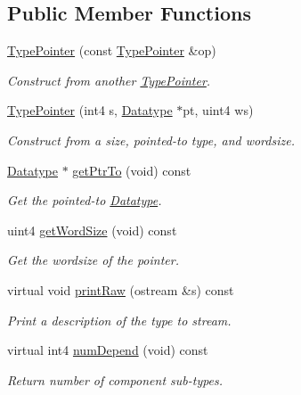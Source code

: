 \subsection*{Public Member Functions}
\begin{DoxyCompactItemize}
\item 
\mbox{\hyperlink{class_type_pointer_a900b24dbd7c0f62e6588312e9c7e3bc6}{Type\+Pointer}} (const \mbox{\hyperlink{class_type_pointer}{Type\+Pointer}} \&op)
\begin{DoxyCompactList}\small\item\em Construct from another \mbox{\hyperlink{class_type_pointer}{Type\+Pointer}}. \end{DoxyCompactList}\item 
\mbox{\hyperlink{class_type_pointer_a22ed9237fd9579b823cf43daefba0c98}{Type\+Pointer}} (int4 s, \mbox{\hyperlink{class_datatype}{Datatype}} $\ast$pt, uint4 ws)
\begin{DoxyCompactList}\small\item\em Construct from a size, pointed-\/to type, and wordsize. \end{DoxyCompactList}\item 
\mbox{\hyperlink{class_datatype}{Datatype}} $\ast$ \mbox{\hyperlink{class_type_pointer_a670e83f887a645c91633a7fa54c60420}{get\+Ptr\+To}} (void) const
\begin{DoxyCompactList}\small\item\em Get the pointed-\/to \mbox{\hyperlink{class_datatype}{Datatype}}. \end{DoxyCompactList}\item 
uint4 \mbox{\hyperlink{class_type_pointer_a6991671504f1098ccba2bcc40adcd3e9}{get\+Word\+Size}} (void) const
\begin{DoxyCompactList}\small\item\em Get the wordsize of the pointer. \end{DoxyCompactList}\item 
virtual void \mbox{\hyperlink{class_type_pointer_a0aece76a1fd245a58d75136ca81fca1b}{print\+Raw}} (ostream \&s) const
\begin{DoxyCompactList}\small\item\em Print a description of the type to stream. \end{DoxyCompactList}\item 
virtual int4 \mbox{\hyperlink{class_type_pointer_a376a0feb3fb85e98df0a7a9f1eeee0ce}{num\+Depend}} (void) const
\begin{DoxyCompactList}\small\item\em Return number of component sub-\/types. \end{DoxyCompactList}\item 

\end{DoxyCompactItemize}
